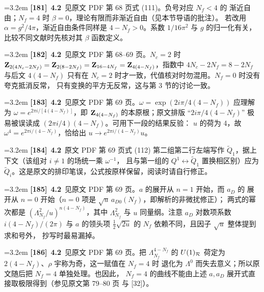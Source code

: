 \par
\par\medskip\noindent\hangindent=3.2em \textbf{[181]}~\textbf{4.2}~见原文 PDF 第 68 页式 (111)。负号对应 $N_f<4$ 的 渐近自由；$N_f=4$ 时 $\beta=0$，理论有限而非渐近自由（见本节导语的批注）。 若改用 $\alpha=g^2/4\pi$，渐近自由条件同样是 $4-N_f>0$。系数 $1/16\pi^2$ 与 $g$ 的归一化有关，比较不同文献时先核对其 $\beta$ 函数定义。
\par
\par\medskip\noindent\hangindent=3.2em \textbf{[182]}~\textbf{4.2}~见原文 PDF 第 68--69 页。$N_c=2$ 时 ${\bf Z}_{2(4N_c-2N_f)}={\bf Z}_{2(8-2N_f)}={\bf Z}_{16-4N_f} ={\bf Z}_{4(4-N_f)}$，指数中 $4N_c-2N_f=8-2N_f$ 与后文 $4(4-N_f)$ 只有在 $N_c=2$ 时才一致，代值核对时勿混用。$N_f=0$ 时没有夸克抵消反常， 只有变换的平方无反常，这与第 3 节的讨论一致。
\par
\par\medskip\noindent\hangindent=3.2em \textbf{[183]}~\textbf{4.2}~见原文 PDF 第 69 页。$\omega={\exp}(2i\pi/4(4-N_f))$ 应理解为 $\omega=e^{2\pi i/[4(4-N_f)]}$，即 ${\bf Z}_{4(4-N_f)}$ 的本原根；原文排版 “$2i\pi/4(4-N_f)$” 极易被误读成 $(2\pi i/4)(4-N_f)$。可用下一段的结果反验： $u$ 的荷为 4，故 $\omega^4=e^{2\pi i/(4-N_f)}$，恰给出 $u\to e^{2\pi i/(4-N_f)}u$。
\par
\par\medskip\noindent\hangindent=3.2em \textbf{[184]}~\textbf{4.2}~原文 PDF 第 69 页式 (112) 第二组第二行左端写作 $\widetilde{Q}_1$，据上下文（该组对 $i\ne1$ 的场统一乘 $\omega^{-1}$， 且与第一组的 $Q^1\leftrightarrow\widetilde Q_1$ 置换相区别）应为 $\widetilde{Q}_i$。这是原文的排印笔误，公式按原样保留，阅读时请自行修正。
\par
\par\medskip\noindent\hangindent=3.2em \textbf{[185]}~\textbf{4.2}~见原文 PDF 第 69 页。$a$ 的展开从 $n=1$ 开始，而 $a_D$ 的 展开从 $n=0$ 开始（$n=0$ 项是 $\sqrt u\,a_{D0}(N_f)$，即解析的非微扰修正）； 两式的幂次都是 $(\Lambda^2_{N_f}/u)^{n(4-N_f)}$，其中 $\Lambda^2_{N_f}$ 与 $u$ 同量纲。注意 $a_D$ 对数项系数 $i(4-N_f)/(2\pi)$ 与 $a$ 的领头项 $\frac12\sqrt{2u}$ 的 $N_f$ 依赖不同，且因子 $\sqrt u$ 整体提到求和号外， 抄写时最易漏掉。
\par
\par\medskip\noindent\hangindent=3.2em \textbf{[186]}~\textbf{4.2}~见原文 PDF 第 69 页。把 $\Lambda_{N_f}^{4-N_f}$ 的 $U(1)_{\cal R}$ 荷定为 $2(4-N_f)$、$\rho$ 宇称为奇，这一赋值在 $N_f=4$ 时 退化为 $\Lambda^0$ 而失去意义；所以原文随后把 $N_f=4$ 单独处理。也因此， $N_f=4$ 的曲线不能由上述 $a,a_D$ 展开式直接取极限得到（参见原文第 79--80 页 与 [32]）。
